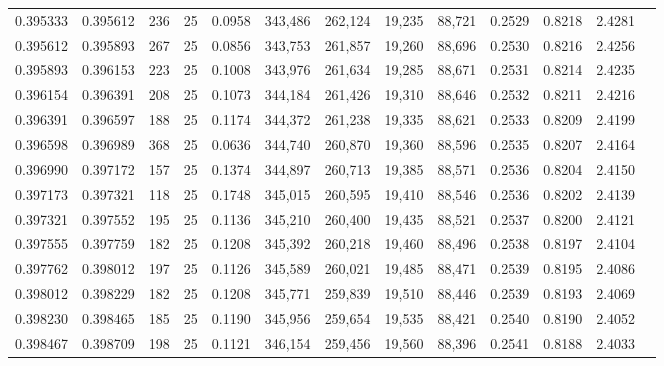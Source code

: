 \begin{tabular}{rrrrrrrrrrrrr}
0.395333 & 0.395612 &   236 &  25 &                                     0.0958 & 343,486 & 262,124 &  19,235 &  88,721 & 0.2529 & 0.8218 & 2.4281 \\
0.395612 & 0.395893 &   267 &  25 &                                     0.0856 & 343,753 & 261,857 &  19,260 &  88,696 & 0.2530 & 0.8216 & 2.4256 \\
0.395893 & 0.396153 &   223 &  25 &                                     0.1008 & 343,976 & 261,634 &  19,285 &  88,671 & 0.2531 & 0.8214 & 2.4235 \\
0.396154 & 0.396391 &   208 &  25 &                                     0.1073 & 344,184 & 261,426 &  19,310 &  88,646 & 0.2532 & 0.8211 & 2.4216 \\
0.396391 & 0.396597 &   188 &  25 &                                     0.1174 & 344,372 & 261,238 &  19,335 &  88,621 & 0.2533 & 0.8209 & 2.4199 \\
0.396598 & 0.396989 &   368 &  25 &                                     0.0636 & 344,740 & 260,870 &  19,360 &  88,596 & 0.2535 & 0.8207 & 2.4164 \\
0.396990 & 0.397172 &   157 &  25 &                                     0.1374 & 344,897 & 260,713 &  19,385 &  88,571 & 0.2536 & 0.8204 & 2.4150 \\
0.397173 & 0.397321 &   118 &  25 &                                     0.1748 & 345,015 & 260,595 &  19,410 &  88,546 & 0.2536 & 0.8202 & 2.4139 \\
0.397321 & 0.397552 &   195 &  25 &                                     0.1136 & 345,210 & 260,400 &  19,435 &  88,521 & 0.2537 & 0.8200 & 2.4121 \\
0.397555 & 0.397759 &   182 &  25 &                                     0.1208 & 345,392 & 260,218 &  19,460 &  88,496 & 0.2538 & 0.8197 & 2.4104 \\
0.397762 & 0.398012 &   197 &  25 &                                     0.1126 & 345,589 & 260,021 &  19,485 &  88,471 & 0.2539 & 0.8195 & 2.4086 \\
0.398012 & 0.398229 &   182 &  25 &                                     0.1208 & 345,771 & 259,839 &  19,510 &  88,446 & 0.2539 & 0.8193 & 2.4069 \\
0.398230 & 0.398465 &   185 &  25 &                                     0.1190 & 345,956 & 259,654 &  19,535 &  88,421 & 0.2540 & 0.8190 & 2.4052 \\
0.398467 & 0.398709 &   198 &  25 &                                     0.1121 & 346,154 & 259,456 &  19,560 &  88,396 & 0.2541 & 0.8188 & 2.4033 \\

\end{tabular}
